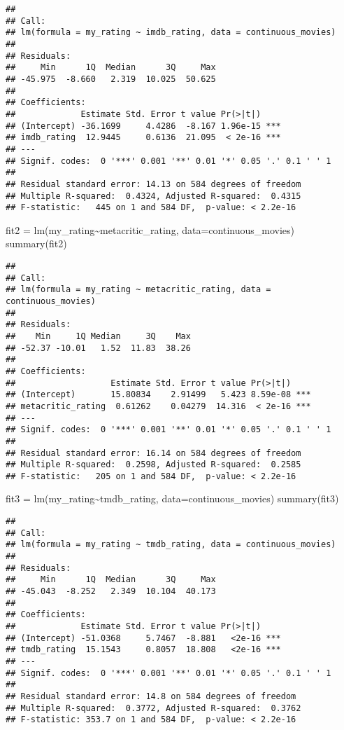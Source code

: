 \documentclass[
]{article}
\newenvironment{Shaded}{\begin{snugshade}}{\end{snugshade}}
\newcommand{\AttributeTok}[1]{\textcolor[rgb]{0.77,0.63,0.00}{#1}}
\newcommand{\FunctionTok}[1]{\textcolor[rgb]{0.00,0.00,0.00}{#1}}
\newcommand{\NormalTok}[1]{#1}
\newcommand{\OtherTok}[1]{\textcolor[rgb]{0.56,0.35,0.01}{#1}}
\newcommand{\SpecialCharTok}[1]{\textcolor[rgb]{0.00,0.00,0.00}{#1}}
\begin{document}
\begin{verbatim}
## 
## Call:
## lm(formula = my_rating ~ imdb_rating, data = continuous_movies)
## 
## Residuals:
##     Min      1Q  Median      3Q     Max 
## -45.975  -8.660   2.319  10.025  50.625 
## 
## Coefficients:
##             Estimate Std. Error t value Pr(>|t|)    
## (Intercept) -36.1699     4.4286  -8.167 1.96e-15 ***
## imdb_rating  12.9445     0.6136  21.095  < 2e-16 ***
## ---
## Signif. codes:  0 '***' 0.001 '**' 0.01 '*' 0.05 '.' 0.1 ' ' 1
## 
## Residual standard error: 14.13 on 584 degrees of freedom
## Multiple R-squared:  0.4324, Adjusted R-squared:  0.4315 
## F-statistic:   445 on 1 and 584 DF,  p-value: < 2.2e-16
\end{verbatim}

\begin{Shaded}
\begin{Highlighting}[]
\NormalTok{fit2 }\OtherTok{=} \FunctionTok{lm}\NormalTok{(my\_rating}\SpecialCharTok{\textasciitilde{}}\NormalTok{metacritic\_rating, }\AttributeTok{data=}\NormalTok{continuous\_movies)}
\FunctionTok{summary}\NormalTok{(fit2)}
\end{Highlighting}
\end{Shaded}

\begin{verbatim}
## 
## Call:
## lm(formula = my_rating ~ metacritic_rating, data = continuous_movies)
## 
## Residuals:
##    Min     1Q Median     3Q    Max 
## -52.37 -10.01   1.52  11.83  38.26 
## 
## Coefficients:
##                   Estimate Std. Error t value Pr(>|t|)    
## (Intercept)       15.80834    2.91499   5.423 8.59e-08 ***
## metacritic_rating  0.61262    0.04279  14.316  < 2e-16 ***
## ---
## Signif. codes:  0 '***' 0.001 '**' 0.01 '*' 0.05 '.' 0.1 ' ' 1
## 
## Residual standard error: 16.14 on 584 degrees of freedom
## Multiple R-squared:  0.2598, Adjusted R-squared:  0.2585 
## F-statistic:   205 on 1 and 584 DF,  p-value: < 2.2e-16
\end{verbatim}

\begin{Shaded}
\begin{Highlighting}[]
\NormalTok{fit3 }\OtherTok{=} \FunctionTok{lm}\NormalTok{(my\_rating}\SpecialCharTok{\textasciitilde{}}\NormalTok{tmdb\_rating, }\AttributeTok{data=}\NormalTok{continuous\_movies)}
\FunctionTok{summary}\NormalTok{(fit3)}
\end{Highlighting}
\end{Shaded}

\begin{verbatim}
## 
## Call:
## lm(formula = my_rating ~ tmdb_rating, data = continuous_movies)
## 
## Residuals:
##     Min      1Q  Median      3Q     Max 
## -45.043  -8.252   2.349  10.104  40.173 
## 
## Coefficients:
##             Estimate Std. Error t value Pr(>|t|)    
## (Intercept) -51.0368     5.7467  -8.881   <2e-16 ***
## tmdb_rating  15.1543     0.8057  18.808   <2e-16 ***
## ---
## Signif. codes:  0 '***' 0.001 '**' 0.01 '*' 0.05 '.' 0.1 ' ' 1
## 
## Residual standard error: 14.8 on 584 degrees of freedom
## Multiple R-squared:  0.3772, Adjusted R-squared:  0.3762 
## F-statistic: 353.7 on 1 and 584 DF,  p-value: < 2.2e-16
\end{verbatim}
\end{document}
